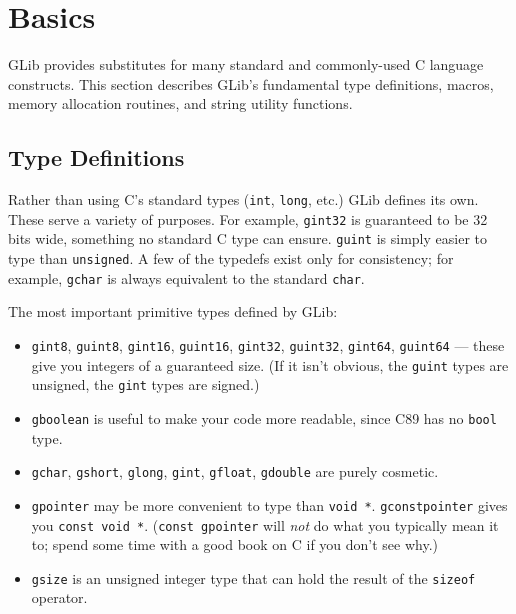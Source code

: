 \section{Basics}

GLib provides substitutes for many standard and commonly-used C language constructs. This section describes GLib's fundamental type definitions, macros, memory allocation routines, and string utility functions.

\subsection{Type Definitions}

Rather than using C's standard types (\lstinline{int}, \lstinline{long}, etc.) GLib defines its own. These serve a variety of purposes. For example, \lstinline{gint32} is guaranteed to be 32 bits wide, something no standard C type can ensure. \lstinline{guint} is simply easier to type than \lstinline{unsigned}. A few of the typedefs exist only for consistency; for example, \lstinline{gchar} is always equivalent to the standard \lstinline{char}.

The most important primitive types defined by GLib:
\begin{itemize}
  \item \lstinline{gint8}, \lstinline{guint8}, \lstinline{gint16}, \lstinline{guint16}, \lstinline{gint32}, \lstinline{guint32}, \lstinline{gint64}, \lstinline{guint64} --- these give you integers of a guaranteed size. (If it isn't obvious, the \lstinline{guint} types are unsigned, the \lstinline{gint} types are signed.)

  \item \lstinline{gboolean} is useful to make your code more readable, since C89 has no \lstinline{bool} type.

  \item \lstinline{gchar}, \lstinline{gshort}, \lstinline{glong}, \lstinline{gint}, \lstinline{gfloat}, \lstinline{gdouble} are purely cosmetic.

  \item \lstinline{gpointer} may be more convenient to type than \lstinline{void *}. \lstinline{gconstpointer} gives you \lstinline{const void *}. (\lstinline{const gpointer} will \emph{not} do what you typically mean it to; spend some time with a good book on C if you don't see why.)

  \item \lstinline{gsize} is an unsigned integer type that can hold the result of the \lstinline{sizeof} operator.
\end{itemize}

